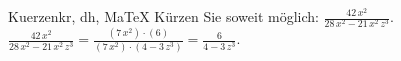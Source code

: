 \begin{MAufgabe}{Kuerzen}{kr, dh, MaTeX}
K\"urzen Sie soweit m\"oglich: $\frac{42\, x^2}{28\, x^2 - 21\, x^2\, z^3}$.\\ 
\ifLsg\MLoesung
\quad $\frac{42\, x^2}{28\, x^2 - 21\, x^2\, z^3}=\frac{(7\, x^2)\cdot(6)}{(7\, x^2)\cdot(4 - 3\, z^3)}=\frac{6}{4 - 3\, z^3}$.\else\relax\fi
 \end{MAufgabe}